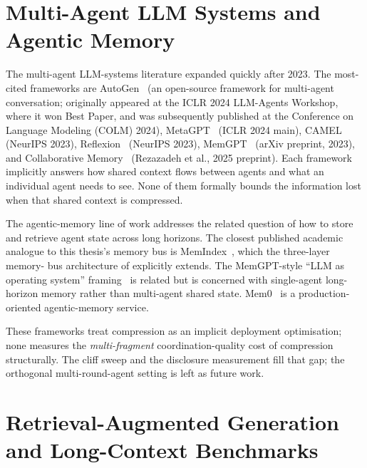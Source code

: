 \section{Multi-Agent LLM Systems and Agentic Memory}
\label{sec:rw_multiagent}

The multi-agent LLM-systems literature expanded quickly after
2023. The most-cited frameworks are
AutoGen~\cite{wu2023autogen} (an open-source framework for
multi-agent conversation; originally appeared at the ICLR 2024
LLM-Agents Workshop, where it won Best Paper, and was subsequently
published at the Conference on Language Modeling (COLM) 2024),
MetaGPT~\cite{hong2024metagpt} (ICLR 2024 main),
CAMEL~\cite{li2023camel} (NeurIPS 2023),
Reflexion~\cite{shinn2023reflexion} (NeurIPS 2023),
MemGPT~\cite{packer2023memgpt} (arXiv preprint, 2023), and
Collaborative Memory~\cite{rezazadeh2025collaborative} (Rezazadeh et al., 2025 preprint). Each
framework implicitly answers how shared context flows between agents
and what an individual agent needs to see. None of them formally
bounds the information lost when that shared context is compressed.

The agentic-memory line of work
\cite{packer2023memgpt, xu2025amem, chhikara2025mem0,
rasmussen2025zep, saleh2025memindex, saleh2025messagebrokers}
addresses the related question of how to store and retrieve
agent state across long horizons. The closest published academic
analogue to this thesis's memory bus is
MemIndex~\cite{saleh2025memindex}, which the three-layer memory-%
bus architecture of  explicitly
extends. The MemGPT-style ``LLM as operating system''
framing~\cite{packer2023memgpt} is related but is concerned with
single-agent long-horizon memory rather than multi-agent shared
state. Mem0~\cite{chhikara2025mem0} is a production-oriented
agentic-memory service.

These frameworks treat compression as an
implicit deployment optimisation; none measures the
\emph{multi-fragment} coordination-quality cost of compression
structurally. The cliff sweep and the disclosure measurement fill
that gap; the orthogonal multi-round-agent setting is left as future work.

\section{Retrieval-Augmented Generation and Long-Context Benchmarks}
\label{sec:rw_rag}

